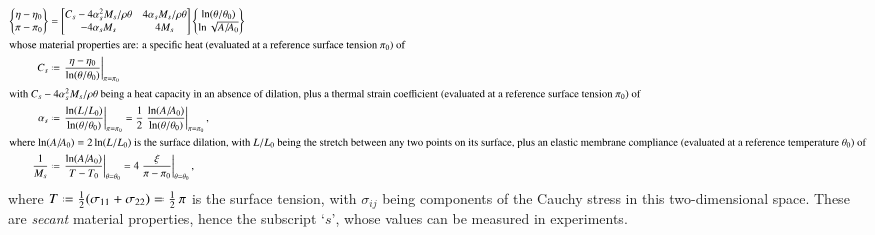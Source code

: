 \begin{subequations}
    \label{uniformGreenCEs}
    \begin{align}
        \left\{ \begin{matrix}
            \eta - \eta_0 \\ \pi - \pi_0
        \end{matrix} \right\} & = \begin{bmatrix}
            C_s - 4 \alpha_s^2 M_s / \rho \theta & 
            4 \alpha_s M_s / \rho \theta \\
            -4 \alpha_s M_s & 4 M_s
        \end{bmatrix} \left\{ \begin{matrix}
            \ln ( \theta / \theta_0 ) \\
            \ln \sqrt{ A / \! A_0 }
        \end{matrix} \right\} 
        \label{uniformGreenMembrane} \\
        \intertext{whose material properties are: a specific heat (evaluated at a reference surface tension $\pi_0$) of}
        C_s & \defeq \left. \frac{\eta - \eta_0}
        {\ln ( \theta / \theta_0 )} \right|_{\pi = \pi_0} 
        \label{membraneSpecificHeat} \\
        \intertext{with $C_s - 4 \alpha_s^2 M_s / \rho \theta$ being a heat capacity in an absence of dilation, plus a thermal strain coefficient (evaluated at a reference surface tension $\pi_0$) of}
        \alpha_s & \defeq \left. \frac{\ln (L / L_0)}
        {\ln ( \theta / \theta_0 )} \right|_{\pi = \pi_0} = 
        \frac{1}{2}\left. \frac{\ln (A / \! A_0)}
        {\ln ( \theta / \theta_0 )} \right|_{\pi = \pi_0} , 
        \label{membraneThermalStraining} \\
        \intertext{where $\ln (A / \!A_0) = 2 \ln (L / L_0)$ is the surface dilation, with $L/L_0$ being the stretch between any two points on its surface, plus an elastic membrane compliance (evaluated at a reference temperature $\theta_0$) of}
        \frac{1}{M_s} & \defeq \left. \frac{\ln (A / \! A_0)}{T-T_0}
        \right|_{\theta = \theta_0} = 
        4 \left. \frac{\xi}{\pi - \pi_0} 
        \right|_{\theta = \theta_0} ,
    \end{align}
\end{subequations}
where $T \defeq \tfrac{1}{2} ( \sigma_{11} + \sigma_{22} ) \eqdef \tfrac{1}{2} \, \pi$ is the surface tension, with $\sigma_{ij}$ being components of the Cauchy stress in this two-dimensional space.  These are \textit{secant\/} material properties, hence the subscript `$s$', whose values can be measured in experiments.

